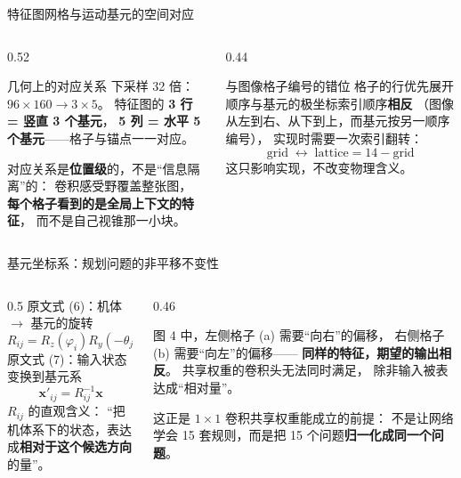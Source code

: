 \begin{frame}{特征图网格与运动基元的空间对应}
  \small
  \begin{columns}[t]
    \begin{column}{0.52\textwidth}
      \begin{block}{几何上的对应关系}
        \footnotesize
        下采样 32 倍：$96\times160 \longrightarrow 3\times5$。
        特征图的 \textbf{3 行 = 竖直 3 个基元}，
        \textbf{5 列 = 水平 5 个基元}——格子与锚点一一对应。
      \end{block}
      \begin{reading}[必须澄清的一点]
        \small
        对应关系是\textbf{位置级}的，不是“信息隔离”的：
        卷积感受野覆盖整张图，
        \textbf{每个格子看到的是全局上下文的特征}，
        而不是自己视锥那一小块。
      \end{reading}
    \end{column}
    \begin{column}{0.44\textwidth}
      \begin{block}{与图像格子编号的错位}
        \footnotesize
        格子的行优先展开顺序与基元的极坐标索引顺序\textbf{相反}
        （图像从左到右、从下到上，而基元按另一顺序编号），
        实现时需要一次索引翻转：
        \[
          \text{grid} \;\leftrightarrow\; \text{lattice}=14-\text{grid}
        \]
        这只影响实现，不改变物理含义。
      \end{block}
    \end{column}
  \end{columns}
\end{frame}

\begin{frame}{基元坐标系：规划问题的非平移不变性}
  \small
  \begin{columns}[t]
    \begin{column}{0.5\textwidth}
      原文式 (6)：机体 $\to$ 基元的旋转
      \[
        R_{ij}=R_z(\varphi_i)R_y(-\theta_j)
      \]
      原文式 (7)：输入状态变换到基元系
      \[
        \mathbf x'_{ij}=R_{ij}^{-1}\mathbf x
      \]
      $R_{ij}$ 的直观含义：
      “把机体系下的状态，表达成\textbf{相对于这个候选方向}的量”。
    \end{column}
    \begin{column}{0.46\textwidth}
      \begin{paperfinding}[矛盾在哪里]
        \small
        图 4 中，左侧格子 (a) 需要“向右”的偏移，
        右侧格子 (b) 需要“向左”的偏移——
        \textbf{同样的特征，期望的输出相反}。
        共享权重的卷积头无法同时满足，
        除非输入被表达成“相对量”。
      \end{paperfinding}
      \begin{reading}
        \scriptsize
        这正是 $1\times1$ 卷积共享权重能成立的前提：
        不是让网络学会 15 套规则，而是把 15 个问题\textbf{归一化成同一个问题}。
      \end{reading}
    \end{column}
  \end{columns}
\end{frame}

